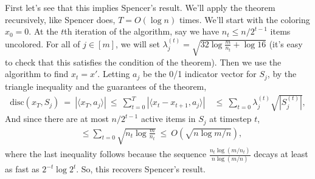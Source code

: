 \documentclass{article}
\theoremstyle{theorem}
\theoremstyle{definition}
\newcommand{\disc}{\mathrm{disc}}
\begin{document}
First let's see that this implies Spencer's result.
We'll apply the theorem recursively, like Spencer does, $T = O(\log n)$ times.
We'll start with the coloring $x_0 = 0$.
At the $t$th iteration of the algorithm, say we have $n_t \le n/2^{t-1}$ items uncolored.
For all of $j \in [m]$, we will set $\lambda^{(t)}_j = \sqrt{32\log{\frac{m}{n_t}} + \log 16}$ (it's easy to check that this satisfies the condition of the theorem).
Then we use the algorithm to find $x_t = x'$.
Letting $a_j$ be the 0/1 indicator vector for $S_j$,
by the triangle inequality and the guarantees of the theorem,
\begin{align*}
\disc(x_T, S_j)
~=~ |\langle x_T, a_j\rangle|
~\le~ \sum_{t=0}^T |\langle x_{t} - x_{t+1}, a_j \rangle|
~&\le ~\sum_{t=0} \lambda_j^{(t)}\sqrt{|S_j^{(t)}|},
\end{align*}
And since there are at most $n/2^{t-1}$ active items in $S_j$ at timestep $t$,
\begin{align*}
&\le \sum_{t=0}\sqrt{n_t\log\frac{m}{n_t}}
~\le~ O(\sqrt{n\log m/n}),
\end{align*}
where the last inequality follows because the sequence $\frac{n_t\log(m/n_t)}{n\log(m/n)}$ decays at least as fast as $2^{-t}\log 2^t$.
So, this recovers Spencer's result.
\end{document}

